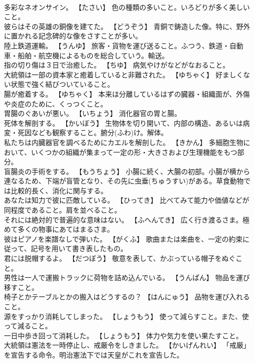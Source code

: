 \documentclass[8pt]{extreport}
\begin{document}
\begin{CJK}{UTF8}{min}
\\	多彩なネオンサイン。	【たさい】 色の種類の多いこと。いろどりが多く美しいこと。
\\	彼らはその英雄の銅像を建てた。	【どうぞう】 青銅で鋳造した像。特に、野外に置かれる記念碑的な像をさすことが多い。
\\	陸上鉄道運輸。	【うんゆ】 旅客・貨物を運び送ること。ふつう、鉄道・自動車・船舶・航空機によるものを総合していう。輸送。
\\	指の切り傷は３日で治癒した。	【ちゆ】 病気やけがなどがなおること。
\\	大統領は一部の資本家と癒着していると非難された。	【ゆちゃく】 好ましくない状態で強く結びついていること。
\\	腸が癒着する。	【ゆちゃく】 本来は分離しているはずの臓器・組織面が、外傷や炎症のために、くっつくこと。
\\	胃腸のぐあいが悪い。	【いちょう】 消化器官の胃と腸。
\\	死体を解剖する。	【かいぼう】 生物体を切り開いて、内部の構造、あるいは病変・死因なども観察すること。腑分(ふわ)け。解体。
\\	私たちは内臓器官を調べるためにカエルを解剖した。	【きかん】 多細胞生物において、いくつかの組織が集まって一定の形・大きさおよび生理機能をもつ部分。
\\	盲腸炎の手術をする。	【もうちょう】 小腸に続く、大腸の初部。小腸が横から連なるため、下端が盲管となり、その先に虫垂(ちゅうすい)がある。草食動物では比較的長く、消化に関与する。
\\	あなたは知力で彼に匹敵している。	【ひってき】 比べてみて能力や価値などが同程度であること。肩を並べること。
\\	それには絶対的で普遍的な意味はない。	【ふへんてき】 広く行き渡るさま。極めて多くの物事にあてはまるさま。
\\	彼はピアノを楽譜なしで弾いた。	【がくふ】 歌曲または楽曲を、一定の約束に従って、記号を用いて書き表したもの。
\\	君には脱帽するよ。	【だつぼう】 敬意を表して、かぶっている帽子をぬぐこと。
\\	男性は一人で運搬トラックに荷物を詰め込んでいる。	【うんぱん】 物品を運び移すこと。
\\	椅子とかテーブルとかの搬入はどうするの？	【はんにゅう】 品物を運び入れること。
\\	源をすっかり消耗してしまった。	【しょうもう】 使って減らすこと。また、使って減ること。
\\	一日中歩き回って消耗した。	【しょうもう】 体力や気力を使い果たすこと。
\\	大統領は憲法を一時停止し、戒厳令をしきました。	【かいげんれい】 「戒厳」を宣告する命令。明治憲法下では天皇がこれを宣告した。

\end{CJK}
\end{document}

